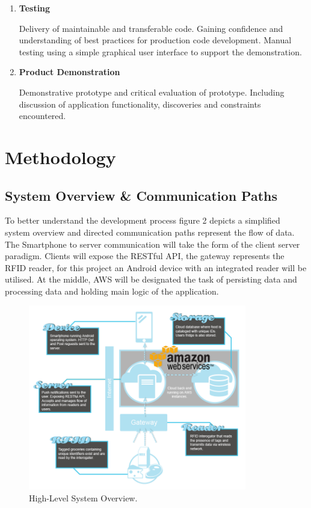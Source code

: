 \documentclass[a4paper, 11pt]{article}
\begin{document}
\begin{enumerate}
  \item \textbf{Testing}
   	\begin{flushleft}Delivery of maintainable and transferable code. Gaining confidence and understanding of best practices for production code development. Manual testing using a simple graphical user interface to support the demonstration.
 	\end{flushleft}
 
 \item \textbf{Product Demonstration}
 	\begin{flushleft}Demonstrative prototype and critical evaluation of prototype. Including discussion of application functionality, discoveries and constraints encountered.
 	\end{flushleft}
\end{enumerate}
\clearpage







\section{Methodology}

\subsection{System Overview \& Communication Paths}

To better understand the development process figure 2 depicts a simplified system overview and directed communication paths represent the flow of data. The Smartphone to server communication will take the form of the client server paradigm. Clients will expose the RESTful API, the gateway represents the RFID reader, for this project an Android device with an integrated reader will be utilised. At the middle, AWS will be designated the task of persisting data and processing data and holding main logic of the application. 

  \vspace{\baselineskip}
\begin{figure}[h!]
  \centering
    \includegraphics[width=0.85\textwidth]{system6.png}
      \caption{High-Level System Overview.}
\end{figure}
\end{document}
